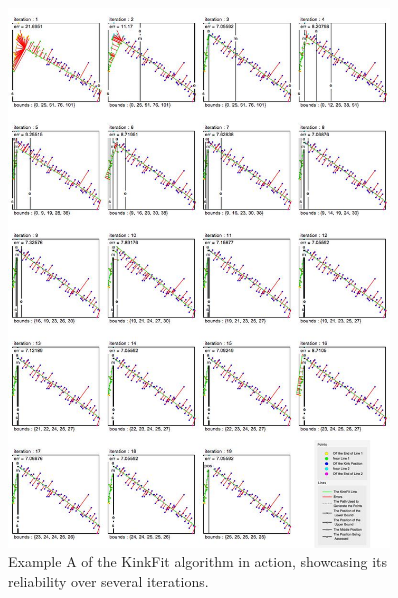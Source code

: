 \begin{figure}[h!]
  \centering
    \includegraphics[width=0.90\textwidth]{Chapter4/Figs/KinkFit_C.jpg}
    \caption{Example A of the KinkFit algorithm in action, showcasing its reliability over several iterations.}\label{fig:KinkFitC}
\end{figure}



